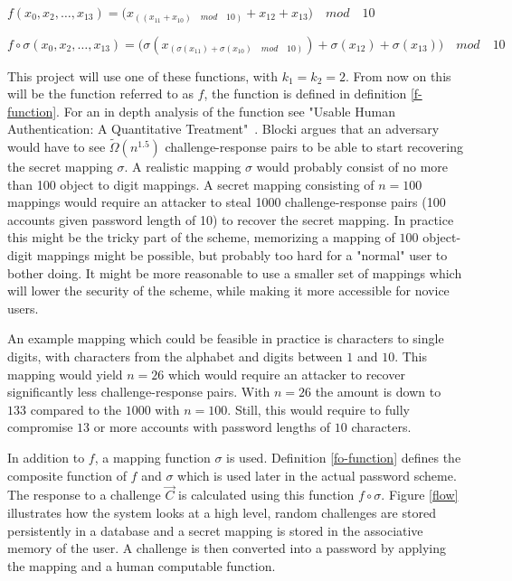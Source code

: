\begin{definition}
    \label{f-function}
    $f(x_0,x_2,\dots,x_{13}) = \big( x_{(( x_{11} + x_{10} )\quad mod \quad 10)} + x_{12} + x_{13} \big)\quad mod \quad 10$ 
\end{definition} 

\begin{definition}
    \label{fo-function}
    $f\circ \sigma(x_0,x_2,\dots,x_{13}) = \big(\sigma ( x_{(\sigma(x_{11}) + \sigma(x_{10})\quad mod \quad 10)} ) +\sigma ( x_{12} ) + \sigma( x_{13} )\big)\quad mod \quad 10$ 
\end{definition}

\par This project will use one of these functions, with $k_1=k_2=2$. From now on this will be the function referred to as $f$, the function is defined in definition \ref{f-function}. For an in depth analysis of the function see "Usable Human Authentication: A Quantitative Treatment"~\cite{Blocki2014}. Blocki argues that an adversary would have to see $\tilde \Omega(n^{1.5})$ challenge-response pairs to be able to start recovering the secret mapping $\sigma$. A realistic mapping $\sigma$ would probably consist of no more than 100 object to digit mappings. A secret mapping consisting of $n=100$ mappings would require an attacker to steal 1000 challenge-response pairs (100 accounts given password length of 10) to recover the secret mapping. In practice this might be the tricky part of the scheme, memorizing a mapping of $100$ object-digit mappings might be possible, but probably too hard for a "normal" user to bother doing. It might be more reasonable to use a smaller set of mappings which will lower the security of the scheme, while making it more accessible for novice users. 
\par An example mapping which could be feasible in practice is characters to single digits, with characters from the alphabet and digits between $1$ and $10$. This mapping would yield $n=26$ which would require an attacker to recover significantly less challenge-response pairs. With $n=26$ the amount is down to $133$ compared to the $1000$ with $n=100$. Still, this would require to fully compromise $13$ or more accounts with password lengths of $10$ characters. 
\par In addition to $f$, a mapping function $\sigma$ is used. Definition \ref{fo-function} defines the composite function of $f$ and $\sigma$ which is used later in the actual password scheme. The response to a challenge $\vec C$ is calculated using this function $f \circ \sigma$. Figure \ref{flow} illustrates how the system looks at a high level, random challenges are stored persistently in a database and a secret mapping is stored in the associative memory of the user. A challenge is then converted into a password by applying the mapping and a human computable function.



